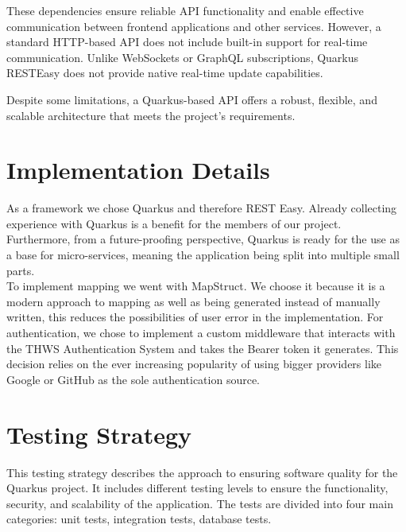 \documentclass[a4paper, 11pt]{article}
\begin{document}
These dependencies ensure reliable API functionality and enable effective communication between frontend applications and other services. However, a standard HTTP-based API does not include built-in support for real-time communication. Unlike WebSockets or GraphQL subscriptions, Quarkus RESTEasy does not provide native real-time update capabilities.

Despite some limitations, a Quarkus-based API offers a robust, flexible, and scalable architecture that meets the project's requirements.



    \section{Implementation Details}\label{sec:implementation-details}
As a framework we chose Quarkus and therefore REST Easy. Already collecting experience with Quarkus is a benefit for the members of our project. Furthermore, from a future-proofing perspective, Quarkus is ready for the use as a base for micro-services, meaning the application being split into multiple small parts.\\
To implement mapping we went with MapStruct. We choose it because it is a modern approach to mapping as well as being generated instead of manually written, this reduces the possibilities of user error in the implementation.
For authentication, we chose to implement a custom middleware that interacts with the THWS Authentication System and takes the Bearer token it generates. This decision relies on the ever increasing popularity of using bigger providers like Google or GitHub as the sole authentication source.



    \section{Testing Strategy}\label{sec:testing-strategy}
This testing strategy describes the approach to ensuring software quality for the Quarkus project. It includes different testing levels to ensure the functionality, security, and scalability of the application. The tests are divided into four main categories: unit tests, integration tests, database tests.
\end{document}
